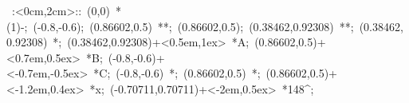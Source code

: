 %


\hbox{
\xy    <2cm,0cm>:<0cm,2cm>::
       (0,0) *\ellipse(1){-}; 
       (-0.8,-0.6); (0.86602,0.5) **\dir{-}; 
       (0.86602,0.5); (0.38462,0.92308) **\dir{-};
       (0.38462,0.92308) *{\bullet};
       (0.38462,0.92308)+<0.5em,1ex> *{A};
       (0.86602,0.5)+<0.7em,0.5ex> *{B};  
       (-0.8,-0.6)+<-0.7em,-0.5ex> *{C}; (-0.8,-0.6) *{\bullet};  
       (0.86602,0.5) *{\bullet};  
       (0.86602,0.5)+<-1.2em,0.4ex> *{x};
       (-0.70711,0.70711)+<-2em,0.5ex>  *{148^\circ};
\endxy}

